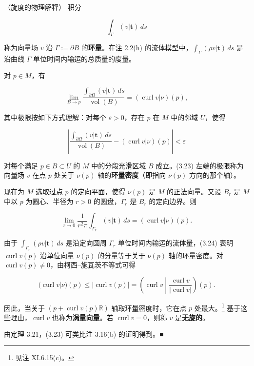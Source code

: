 \begin{remark}

（旋度的物理解释） 积分

\[
\int_\Gamma (v|\mathbf{t})\, ds
\]

称为向量场 $ v $ 沿 $ \Gamma := \partial B $ 的\textbf{环量}。在注 2.2(h) 的流体模型中，$ \int_\Gamma (\rho v|\mathbf{t})\, ds $ 是沿曲线 $ \Gamma $ 单位时间内输运的总质量的度量。


对 $ p \in M $，有

\begin{equation}
\lim_{B \to p} \frac{\int_{\partial\Omega}(v|\mathbf{t})\, ds}{\operatorname{vol}(B)} = (\operatorname{curl} v|\nu)(p) ,\tag{3.23}
\end{equation}

其中极限按如下方式理解：对每个 $ \varepsilon > 0 $，存在 $ p $ 在 $ M $ 中的邻域 $ U $，使得

\[
\left| \frac{\int_{\partial\Omega}(v|\mathbf{t})\, ds}{\operatorname{vol}(B)} - (\operatorname{curl} v|\nu)(p) \right| < \varepsilon
\]

对每个满足 $ p \in B \subset U $ 的 $ M $ 中的分段光滑区域 $ B $ 成立。(3.23) 左端的极限称为向量场 $ v $ 在点 $ p $ 处关于 $ \nu(p) $ 轴的\textbf{环量密度}（即指向 $ \nu(p) $ 方向的那个轴）。


现在为 $ M $ 选取过点 $ p $ 的定向平面，使得 $ \nu(p) $ 是 $ M $ 的正法向量。又设 $ B_r $ 是 $ M $ 中以 $ p $ 为圆心、半径为 $ r > 0 $ 的圆盘，$ \Gamma_r $ 是 $ B_r $ 的定向边界。则

\begin{equation}
\lim_{r \to 0} \frac{1}{r^2\pi} \int_{\Gamma_r} (v|\mathbf{t})\, ds = (\operatorname{curl} v|\nu)(p) .\tag{3.24}
\end{equation}

由于 $ \int_{\Gamma_r}(\rho v|\mathbf{t})\, ds $ 是沿定向圆周 $ \Gamma_r $ 单位时间内输运的流体量，(3.24) 表明 $ \operatorname{curl} v(p) $ 沿单位向量 $ \nu(p) $ 的分量等于关于 $ \nu(p) $ 轴的环量密度。对 $ \operatorname{curl} v(p) \neq 0 $，由柯西–施瓦茨不等式可得

\[
(\operatorname{curl} v|\nu)(p) \le |\operatorname{curl} v(p)| = \left(\operatorname{curl} v \middle| \frac{\operatorname{curl} v}{|\operatorname{curl} v|}\right)(p) .
\]

因此，当关于 $ (p + \operatorname{curl} v(p)\mathbb{R}) $ 轴取环量密度时，它在点 $ p $ 处最大。\footnote{见注 XI.6.15(c)。} 基于这些理由，$ \operatorname{curl} v $ 也称为\textbf{涡量向量}。若 $ \operatorname{curl} v = 0 $，则称 $ v $ 是\textbf{无旋的}。

\proofhead
由定理 3.21，(3.23) 可类比注 3.16(b) 的证明得到。\nobreak\hspace{0.35em}■
\end{remark}

